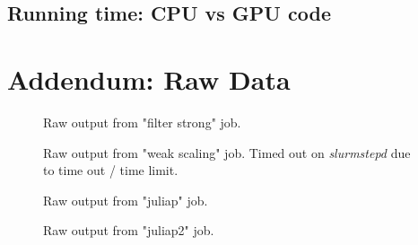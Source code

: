 \documentclass[a4paper,%
11pt,%
DIV12,
headsepline,%
headings=normal,
]{scrartcl}
\begin{document}
\subsection{Running time: CPU vs GPU code}

\newpage

\section{Addendum: Raw Data}

\begin{figure}[htbp]
    \centering
    \label{tab:filter_strong}
    \caption{Raw output from "filter strong" job.}
\end{figure}

\begin{figure}[htbp]
    \centering
    \label{tab:filter_weak}
    \caption{Raw output from "weak scaling" job. Timed out on \textit{slurmstepd} due to time out / time limit.}
\end{figure}

\begin{figure}[htbp]
    \centering
    \label{tab:juliap}
    \caption{Raw output from "juliap" job.}
\end{figure}

\begin{figure}[htbp]
    \centering
    \label{tab:juliap2}
    \caption{Raw output from "juliap2" job.}
\end{figure}
\end{document}
